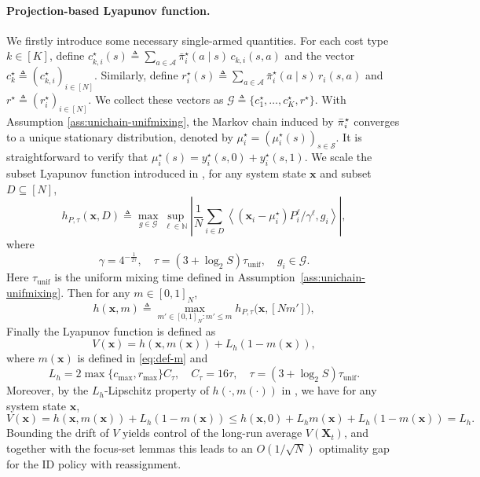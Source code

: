 \documentclass[mnsc,nonblindrev]{informs3}
\newcommand{\pibst}{\Bar{\pi}^\star}
\newcommand{\tmix}{\tau_{\mathrm{unif}}}
\newcommand{\bmx}{\bm{x}}
\newcommand{\Actions}{\mathcal{A}}
\begin{document}
\begin{APPENDICES}
\paragraph{Projection-based Lyapunov function.}
We firstly introduce some necessary single-armed quantities.
For each cost type $k\in[K]$, define
$c^\star_{k,i}(s) \triangleq \sum_{a\in\Actions}\bar{\pi}^\star_i(a\mid s)\,c_{k,i}(s,a)$ and the vector
$c^\star_k \triangleq (c^\star_{k,i})_{i\in[N]}$.
Similarly, define $r^\star_i(s) \triangleq \sum_{a\in\Actions}\bar{\pi}^\star_i(a\mid s)\,r_i(s,a)$ and
$r^\star \triangleq (r^\star_i)_{i\in[N]}$.
We collect these vectors as $\mathcal{G}\triangleq\{c^\star_1,\dots,c^\star_K,r^\star\}$.
With Assumption \ref{ass:unichain-unifmixing}, the Markov chain induced by \( \pibst_i \) converges to a unique stationary distribution, denoted by \( \mu_i^\star = (\mu_i^\star(s))_{s \in \mathcal{S}} \). It is straightforward to verify that \( \mu_i^\star(s) = y_i^\star(s, 0) + y_i^\star(s, 1) \). We scale the subset Lyapunov function introduced in \citep{zhang2025projection}, for any system state $\bmx$ and subset $D\subseteq [N]$,
\begin{equation*}
    h_{P,\tau}(\bmx,D)
    \triangleq \max_{g\in\mathcal{G}} \sup_{\ell\in\mathbb{N}}
    \left|
    \frac{1}{N}\sum_{i\in D}
    \left\langle
    (\bmx_i - \mu_i^\star)P_i^{\ell}/\gamma^{\ell},
    g_i
    \right\rangle
    \right|,
\end{equation*}
where 
\begin{equation}\label{def:gamma-tau-g}
    \gamma = 4^{-\frac{1}{2\tau}},\quad\tau=(3+\log_2S)\tmix,\quad g_i\in\mathcal{G}.
\end{equation}
Here $\tmix$ is the uniform mixing time defined in Assumption~\ref{ass:unichain-unifmixing}. Then for any $m\in[0,1]_N$,
\begin{equation}\label{def:h}
h(\bmx,m)\triangleq\max_{m'\in[0,1]_N: m'\le m}h_{P,\tau}\bigl(\bmx,[N m']\bigr),
\end{equation}
Finally the Lyapunov function is defined as
\begin{equation}\label{def:lya-true}
     V(\bmx)=h(\bmx,m(\bmx))+L_h(1-m(\bmx)),
\end{equation}
where $m(\bmx)$ is defined in \eqref{eq:def-m} and 
\begin{equation}\label{eq:def-Lh-Ctau-tau}
    L_h = 2\max\{c_{\max},r_{\max}\} C_\tau,\quad
C_{\tau} = 16\tau,\quad \tau=(3+\log_2S)\tmix.
\end{equation}
Moreover, by the \(L_h\)-Lipschitz property of \(h(\cdot,m(\cdot))\) in
\citet[Lemma~7]{zhang2025projection}, we have for any system state $\bmx$,
\begin{equation}\label{eq:bound-V-hete}
    V(\bmx)
    =
    h(\bmx,m(\bmx))+L_h(1-m(\bmx))  
    \le
    h(\bmx,0)+L_hm(\bmx)+L_h(1-m(\bmx))
    =
    L_h .
\end{equation}
Bounding the drift of $V$ yields control of the long-run average $V(\bm{X}_t)$, and together with the focus-set lemmas
this leads to an $O(1/\sqrt{N})$ optimality gap for the ID policy with reassignment.


\end{APPENDICES}
\end{document}
